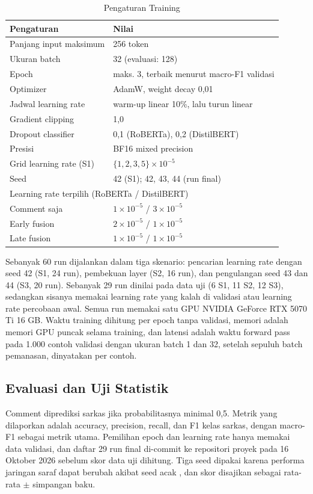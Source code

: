 \documentclass[conference]{IEEEtran}
\begin{document}
\begin{table}[t]
\caption{Pengaturan Training}
\label{tab:setup}
\centering
\begin{tabular}{ll}
\hline
Pengaturan & Nilai \\
\hline
Panjang input maksimum & 256 token \\
Ukuran batch & 32 (evaluasi: 128) \\
Epoch & maks. 3, terbaik menurut macro-F1 validasi \\
Optimizer & AdamW, weight decay 0,01 \\
Jadwal learning rate & warm-up linear 10\%, lalu turun linear \\
Gradient clipping & 1,0 \\
Dropout classifier & 0,1 (RoBERTa), 0,2 (DistilBERT) \\
Presisi & BF16 mixed precision \\
Grid learning rate (S1) & $\{1, 2, 3, 5\} \times 10^{-5}$ \\
Seed & 42 (S1); 42, 43, 44 (run final) \\
\hline
\multicolumn{2}{l}{Learning rate terpilih (RoBERTa / DistilBERT)} \\
\quad Comment saja & $1 \times 10^{-5}$ / $3 \times 10^{-5}$ \\
\quad Early fusion & $2 \times 10^{-5}$ / $1 \times 10^{-5}$ \\
\quad Late fusion & $1 \times 10^{-5}$ / $1 \times 10^{-5}$ \\
\hline
\end{tabular}
\end{table}

Sebanyak 60 run dijalankan dalam tiga skenario: pencarian learning rate dengan seed 42 (S1, 24 run), pembekuan layer (S2, 16 run), dan pengulangan seed 43 dan 44 (S3, 20 run). Sebanyak 29 run dinilai pada data uji (6 S1, 11 S2, 12 S3), sedangkan sisanya memakai learning rate yang kalah di validasi atau learning rate percobaan awal. Semua run memakai satu GPU NVIDIA GeForce RTX 5070 Ti 16 GB. Waktu training dihitung per epoch tanpa validasi, memori adalah memori GPU puncak selama training, dan latensi adalah waktu forward pass pada 1.000 contoh validasi dengan ukuran batch 1 dan 32, setelah sepuluh batch pemanasan, dinyatakan per contoh.

\subsection{Evaluasi dan Uji Statistik}
Comment diprediksi sarkas jika probabilitasnya minimal 0,5. Metrik yang dilaporkan adalah accuracy, precision, recall, dan F1 kelas sarkas, dengan macro-F1 sebagai metrik utama. Pemilihan epoch dan learning rate hanya memakai data validasi, dan daftar 29 run final di-commit ke repositori proyek pada 16 Oktober 2026 sebelum skor data uji dihitung. Tiga seed dipakai karena performa jaringan saraf dapat berubah akibat seed acak \cite{ulmer2022deep}, dan skor disajikan sebagai rata-rata $\pm$ simpangan baku.
\end{document}
